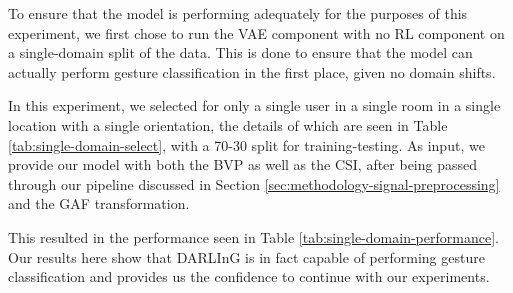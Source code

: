 To ensure that the model is performing adequately for the purposes of this experiment, we first chose to run the VAE component with no RL component on a single-domain split of the data.
This is done to ensure that the model can actually perform gesture classification in the first place, given no domain shifts.

In this experiment, we selected for only a single user in a single room in a single location with a single orientation, the details of which are seen in Table \ref{tab:single-domain-select}, with a 70-30 split for training-testing.
As input, we provide our model with both the BVP as well as the CSI, after being passed through our pipeline discussed in Section \ref{sec:methodology-signal-preprocessing} and the GAF transformation.

This resulted in the performance seen in Table \ref{tab:single-domain-performance}.
Our results here show that DARLInG is in fact capable of performing gesture classification and provides us the confidence to continue with our experiments.

